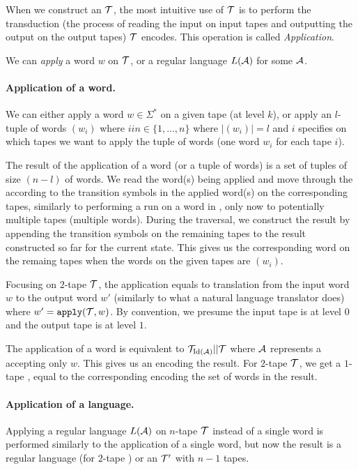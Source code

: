 When we construct an \nft $\mathcal{T}$, the most intuitive use of $\mathcal{T}$ is to perform the transduction (the process of reading the input on input tapes and outputting the output on the output tapes) $\mathcal{T}$ encodes.
This operation is called \emph{Application}.

We can \emph{apply} a word $w$ on $\mathcal{T}$, or a regular language $L(\mathcal{A})$ for some $\mathcal{A}$.

\paragraph{Application of a word.}
We can either apply a word $w \in \Sigma^*$ on a given tape (at level $k$), or apply an $l$-tuple of words $(w_i)$ where $i in \in \{ 1, \ldots, n \}$ where $|(w_i)| = l$ and $i$ specifies on which tapes we want to apply the tuple of words (one word $w_i$ for each tape $i$).

The result of the application of a word (or a tuple of words) is a set of tuples of size $(n - l)$ of words.
We read the word(s) being applied and move through the \nft according to the transition symbols in the applied word(s) on the corresponding tapes, similarly to performing a run on a word in \nfa, only now to potentially multiple tapes (multiple words).
During the traversal, we construct the result by appending the transition symbols on the remaining tapes to the result constructed so far for the current state.
This gives us the corresponding word on the remaing tapes when the words on the given tapes are $(w_i)$.

Focusing on $2$-tape \nfts $\mathcal{T}$, the application equals to translation from the input word $w$ to the output word $w'$ (similarly to what a natural language translator does) where $w' = \texttt{apply}(\mathcal{T}, w)$.
By convention, we presume the input tape is at level $0$ and the output tape is at level $1$.

The application of a word is equivalent to $\mathcal{T}_{\text{Id}(\mathcal{A})} || \mathcal{T}$ where $\mathcal{A}$ represents a \dfa accepting only $w$.
This gives us an \nft encoding the result.
For $2$-tape $\mathcal{T}$, we get a $1$-tape \nft, equal to the corresponding \nfa encoding the set of words in the result.

\paragraph{Application of a language.}
Applying a regular language $L(\mathcal{A})$ on $n$-tape \nft $\mathcal{T}$ instead of a single word is performed similarly to the application of a single word, but now the result is a regular language (for $2$-tape \nfts) or an \nft $\mathcal{T}'$ with $n-1$ tapes.

